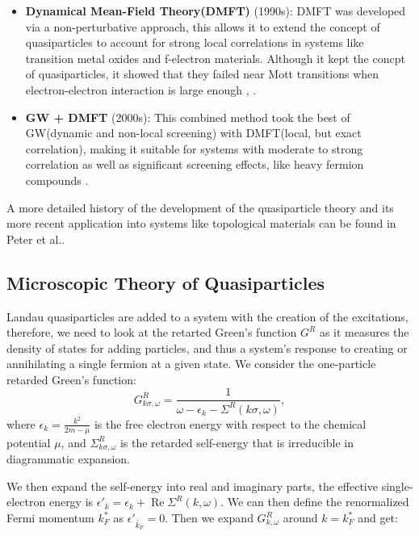 \begin{itemize}
	\item\textbf{Dynamical Mean-Field Theory(DMFT)} (1990s):
	DMFT was developed via a non-perturbative approach, this allows it to extend the concept of quasiparticles to account for strong local correlations in systems like transition metal oxides and f-electron materials. Although it kept the concpt of quasiparticles, it showed that they failed near Mott transitions when electron-electron interaction is large enough \cite{metznerCorrelatedLatticeFermions1989}, \cite{georgesDynamicalMeanfieldTheory1996}.
	
	\item\textbf{GW + DMFT} (2000s):
	This combined method took the best of GW(dynamic and non-local screening) with DMFT(local, but exact correlation), making it suitable for systems with moderate to strong correlation as well as significant screening effects, like heavy fermion compounds \cite{biermannFirstprinciplesApproachElectronic2003}.
\end{itemize}

A more detailed history of the development of the quasiparticle theory and its more recent application into systems like topological materials can be found in Peter et al.\cite{wolfleQuasiparticlesCondensedMatter2018}. 

\subsection{Microscopic Theory of Quasiparticles}
Landau quasiparticles are added to a system with the creation of the excitations, therefore, we need to look at the retarted Green's function $G^R$ as it measures the density of states for adding particles, and thus a system's response to creating or annihilating a single fermion at a given state. We consider the one-particle retarded Green's function: 
\begin{equation}\label{retardedgreen}
	G^R_{k \sigma, \omega} = \frac{1}{\omega -\epsilon_k - \Sigma^R(k \sigma, \omega)},
\end{equation}
where $\epsilon_k= \frac{k^2}{2m-\mu}$ is the free electron energy with respect to the chemical potential $\mu$, and $\Sigma^R_{k \sigma, \omega}$ is the retarded self-energy that is irreducible in diagrammatic expansion. 

We then expand the self-energy into real and imaginary parts, the effective single-electron energy is $\epsilon'_{k} = \epsilon_k + \operatorname{Re}\Sigma^R(k,\omega)$. We can then define the renormalized Fermi momentum $k^*_{F}$ as $\epsilon'_{\tilde{k_{F}}} = 0$. Then we expand $G^R_{k, \omega}$ around $k = k^*_{F}$ and get: 

